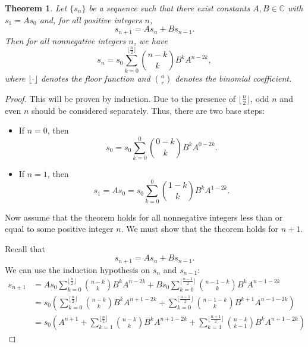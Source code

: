 \documentclass[12pt]{article}
\newtheorem*{thm*}{Theorem}
\begin{document}

\begin{thm*}
Let $\{s_n\}$ be a sequence such that there exist constants $A,B\in\mathbb{C}$ with $s_1=As_0$ and, for all positive integers $n$,
\[
s_{n+1}=As_n+Bs_{n-1}.
\]
Then for all nonnegative integers $n$, we have
\[
s_n=s_0\sum_{k=0}^{\lfloor\frac{n}{2}\rfloor} \binom{n-k}{k} B^k A^{n-2k},
\]
where $\lfloor\cdot\rfloor$ denotes the floor function and $\binom{a}{r}$ denotes the binomial coefficient.
\end{thm*}

\begin{proof}
This will be proven by induction.  Due to the presence of $\lfloor\frac{n}{2}\rfloor$, odd $n$ and even $n$ should be considered separately.  Thus, there are two base steps:
\begin{itemize}
\item If $n=0$, then
\[
s_0=s_0\sum_{k=0}^0 \binom{0-k}{k} B^k A^{0-2k}.
\]
\item If $n=1$, then
\[
s_1=As_0=s_0\sum_{k=0}^0 \binom{1-k}{k} B^k A^{1-2k}.
\]
\end{itemize}

Now assume that the theorem holds for all nonnegative integers less than or equal to some positive integer $n$.  We must show that the theorem holds for $n+1$.

Recall that
\[
s_{n+1}=As_n+Bs_{n-1}.
\]
We can use the induction hypothesis on $s_n$ and $s_{n-1}$:
\begin{align*}
s_{n+1} & =As_0\sum_{k=0}^{\lfloor\frac{n}{2}\rfloor} \binom{n-k}{k} B^k A^{n-2k} +Bs_0\sum_{k=0}^{\lfloor\frac{n-1}{2}\rfloor} \binom{n-1-k}{k} B^k A^{n-1-2k} \\
& =s_0\left( \sum_{k=0}^{\lfloor\frac{n}{2}\rfloor} \binom{n-k}{k} B^k A^{n+1-2k}
+\sum_{k=0}^{\lfloor\frac{n-1}{2}\rfloor} \binom{n-1-k}{k} B^{k+1} A^{n-1-2k} \right) \\
& =s_0\left( A^{n+1}+\sum_{k=1}^{\lfloor\frac{n}{2}\rfloor} \binom{n-k}{k} B^k A^{n+1-2k}
+\sum_{k=1}^{\lfloor\frac{n+1}{2}\rfloor} \binom{n-k}{k-1} B^k A^{n+1-2k} \right)
\end{align*}


\end{proof}
\end{document}
